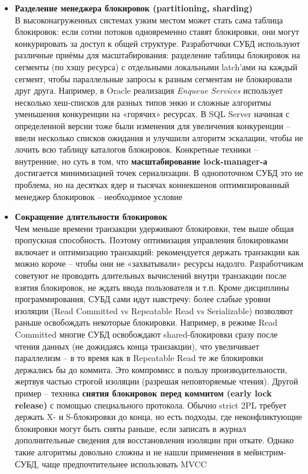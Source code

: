 \begin{itemize}
    \item \textbf{Разделение менеджера блокировок (partitioning, sharding)} ~\\
    В высоконагруженных системах узким местом может стать сама таблица блокировок: если сотни потоков одновременно ставят блокировки, они могут конкурировать за доступ к общей структуре. Разработчики СУБД используют различные приёмы для масштабирования: разделение таблицы блокировок на сегменты (по хэшу ресурса) с отдельными локальными latch’ами на каждый сегмент, чтобы параллельные запросы к разным сегментам не блокировали друг друга. Например, в Oracle реализация \textit{Enqueue Services} использует несколько хеш-списков для разных типов энкю и сложные алгоритмы уменьшения конкуренции на «горячих» ресурсах. В SQL Server начиная с определенной версии тоже были изменения для увеличения конкуренции – ввели несколько списков ожидания и улучшили алгоритм эскалации, чтобы не лочить всю таблицу каталогов блокировок. Конкретные техники – внутренние, но суть в том, что \textbf{масштабирование lock-manager-а} достигается минимизацией точек сериализации. В однопоточном СУБД это не проблема, но на десятках ядер и тысячах коннекшенов оптимизированный менеджер блокировок – необходимое условие
    \item \textbf{Сокращение длительности блокировок} ~\\
    Чем меньше времени транзакции удерживают блокировки, тем выше общая пропускная способность. Поэтому оптимизация управления блокировками включает и оптимизацию транзакций: рекомендуется держать транзакции как можно короче – чтобы они не «захватывали» ресурсы надолго. Разработчикам советуют не проводить длительных вычислений внутри транзакции после взятия блокировок, не ждать ввода пользователя и т.п. Кроме дисциплины программирования, СУБД сами идут навстречу: более слабые уровни изоляции (Read Committed vs Repeatable Read vs Serializable) позволяют раньше освобождать некоторые блокировки. Например, в режиме Read Committed многие СУБД освобождают shared-блокировки сразу после чтения данных (не дожидаясь конца транзакции), что увеличивает параллелизм – в то время как в Repeatable Read те же блокировки держались бы до коммита. Это компромисс в пользу производительности, жертвуя частью строгой изоляции (разрешая неповторяемые чтения). Другой пример – техника \textbf{снятия блокировок перед коммитом (early lock release)} с помощью специального протокола. Обычно strict 2PL требует держать X- и S-блокировки до конца, но есть подходы, где неконфликтующие блокировки могут быть сняты раньше, если записать в журнал дополнительные сведения для восстановления изоляции при откате. Однако такие алгоритмы довольно сложны и не нашли применения в мейнстрим-СУБД, чаще предпочтительнее использовать MVCC

\end{itemize}
